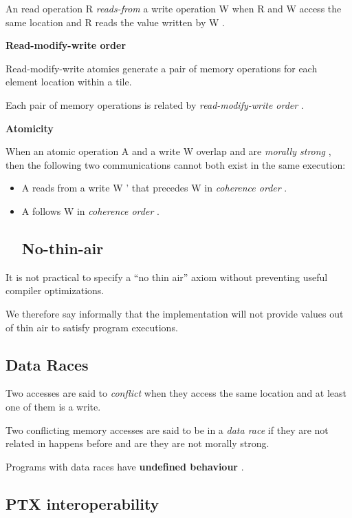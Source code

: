 \documentclass{article}
\begin{document}
An read operation R \textit{reads-from} a write operation W when R and W access the same location and R reads the value written by W .


\textbf{Read-modify-write order}


Read-modify-write atomics generate a pair of memory operations for each element location within a tile.

Each pair of memory operations is related by \textit{read-modify-write order} .


\textbf{Atomicity}


When an atomic operation A and a write W overlap and are \textit{morally strong} , then the following two communications cannot both exist in the same execution:


\begin{itemize}
\item A reads from a write W ' that precedes W in \textit{coherence order} .
\item A follows W in \textit{coherence order} .


\subsection{No-thin-air}

\end{itemize}
It is not practical to specify a ``no thin air'' axiom without preventing useful compiler optimizations.

We therefore say informally that the implementation will not provide values out of thin air to satisfy program executions.



\subsection{Data Races}

Two accesses are said to \textit{conflict} when they access the same location and at least one of them is a write.


Two conflicting memory accesses are said to be in a \textit{data race} if they are not related in happens before and are they are not morally strong.


Programs with data races have \textbf{undefined behaviour} .



\subsection{PTX interoperability}
\end{document}
